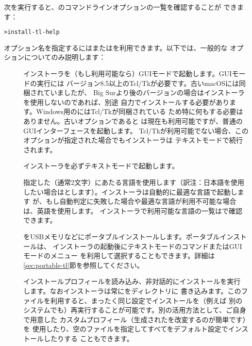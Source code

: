 \documentclass[uplatex,dvipdfmx,12pt,tombow]{jsarticle}
\begin{document}
次を実行すると、のコマンドラインオプションの一覧を確認することが
できます：
%
\begin{alltt}
> install-tl -help
\end{alltt}
%
オプション名を指定するには\sopt{}または\lopt{}を利用できます。以下では、一般的な
オプションについてのみ説明します：
%
\begin{description}
\item[]
インストーラを（もし利用可能なら）GUIモードで起動します。GUIモードの実行には
バージョン8.5以上のTcl/Tkが必要です。古いmacOSには同梱されていましたが、
Big Surより後のバージョンの場合は\MacTeX インストーラを使用しないのであれば、別途
自力でインストールする必要があります。Windows用の\TL にはTcl/Tkが同梱されている
ため特に何もする必要はありません。古いオプションであると
は現在も利用可能ですが、普通のGUIインターフェースを起動します。
Tcl/Tkが利用可能でない場合、このオプションが指定された場合でもインストーラは
テキストモードで続行されます。

\item[]
インストーラを必ずテキストモードで起動します。

\item[]
指定した（通常2文字）にあたる言語を使用します（訳注：日本語を使用
したい場合はとします）。インストーラは自動的に最適な言語で起動します
が、もし自動判定に失敗した場合や最適な言語が利用不可能な場合は、英語を使用します。
インストーラで利用可能な言語の一覧はで確認できます。

\item[]
\TL をUSBメモリなどにポータブルインストールします。ポータブルインストールは、
インストーラの起動後にテキストモードのコマンドまたはGUIモードのメニュー
を利用して選択することもできます。詳細は\ref{sec:portable-tl}節を参照してください。

\item[]
インストールプロフィールを読み込み、非対話的にインストールを実行
します。なおインストーラは常にをディレクトリに
書き込みます。このファイルを利用すると、まったく同じ設定でインストールを（例えば
別のシステムでも）再実行することが可能です。別の活用方法として、ご自身で用意した
カスタムプロフィール（生成されたを改変するのが簡単です）を
使用したり、空のファイルを指定してすべてをデフォルト設定でインストールしたりする
こともできます。


\end{description}
\end{document}
